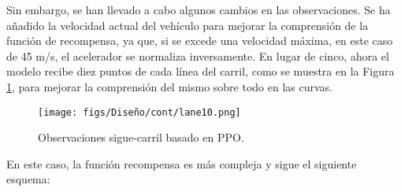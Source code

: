 Sin embargo, se han llevado a cabo algunos cambios en las observaciones. Se ha añadido la velocidad actual del vehículo para mejorar la comprensión de la función de recompensa, ya que, si se excede una velocidad máxima, en este caso de 45 m/s, el acelerador se normaliza inversamente. En lugar de cinco, ahora el modelo recibe diez puntos de cada línea del carril, como se muestra en la Figura \ref{fig:puntos_carril_ppo}, para mejorar la comprensión del mismo sobre todo en las curvas.
\begin{figure}[ht]
\centering
\texttt{[image: figs/Diseño/cont/lane10.png]}
\caption{Observaciones sigue-carril basado en \ac{PPO}.}
\label{fig:puntos_carril_ppo}
\end{figure}

En este caso, la función recompensa es más compleja y sigue el siguiente esquema:
